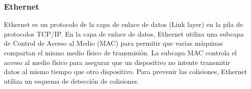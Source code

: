     
%		
%
%
%
%
%
%
%
%
%



\subsubsection{Ethernet}

Ethernet es un protocolo de la capa de enlace de datos (Link layer) en la pila de protocolos TCP/IP. En la capa de enlace de datos, Ethernet utiliza una subcapa de Control de Acceso al Medio (MAC) para permitir que varias máquinas compartan el mismo medio físico de transmisión. La subcapa MAC controla el acceso al medio físico para asegurar que un dispositivo no intente transmitir datos al mismo tiempo que otro dispositivo. Para prevenir las colisiones, Ethernet utiliza un esquema de detección de colisiones.

